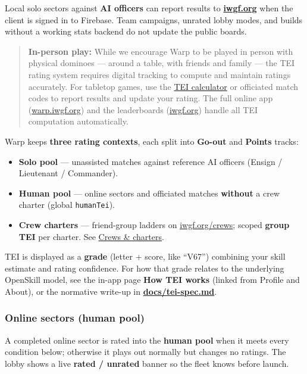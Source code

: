\documentclass[11pt]{article}
\providecommand{\tightlist}{%
  \setlength{\itemsep}{0pt}\setlength{\parskip}{0pt}}
\begin{document}
Local solo sectors against \textbf{AI officers} can report results to
\textbf{\href{https://iwgf.org}{iwgf.org}} when the client is signed in
to Firebase. Team campaigns, unrated lobby modes, and builds without a
working stats backend do not update the public boards.

\begin{quote}
\textbf{In-person play:} While we encourage Warp to be played in person with physical dominoes --- around a table, with friends and family --- the TEI rating system requires digital tracking to compute and maintain ratings accurately. For tabletop games, use the \href{https://iwgf.org/calculator}{TEI calculator} or officiated match codes to report results and update your rating. The full online app (\href{https://warp.iwgf.org}{warp.iwgf.org}) and the leaderboards (\href{https://iwgf.org}{iwgf.org}) handle all TEI computation automatically.
\end{quote}

Warp keeps \textbf{three rating contexts}, each split into
\textbf{Go-out} and \textbf{Points} tracks:

\begin{itemize}
\tightlist
\item
  \textbf{Solo pool} --- unassisted matches against reference AI
  officers (Ensign / Lieutenant / Commander).
\item
  \textbf{Human pool} --- online sectors and officiated matches
  \textbf{without} a crew charter (global \texttt{humanTei}).
\item
  \textbf{Crew charters} --- friend-group ladders on
  \href{https://iwgf.org/crews}{iwgf.org/crews}; scoped \textbf{group
  TEI} per charter. See \href{docs/crews-roadmap.md}{Crews \& charters}.
\end{itemize}

TEI is displayed as a \textbf{grade} (letter + score, like ``V67'')
combining your skill estimate and rating confidence. For how that
grade relates to the underlying OpenSkill model, see the in-app page
\textbf{How TEI works} (linked from Profile and About), or the
normative write-up in \textbf{\url{docs/tei-spec.md}}.

\subsubsection{Online sectors (human
pool)}\label{online-sectors-human-pool}

A completed online sector is rated into the \textbf{human pool} when it
meets every condition below; otherwise it plays out normally but changes
no ratings. The lobby shows a live \textbf{rated / unrated} banner so
the fleet knows before launch.
\end{document}
